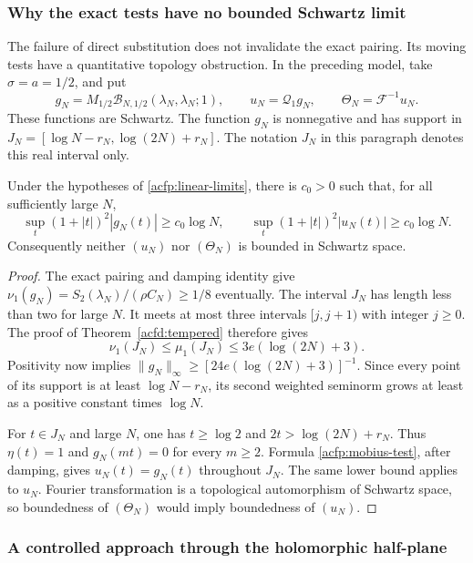 \subsubsection{Why the exact tests have no bounded Schwartz limit}

The failure of direct substitution does not invalidate the exact pairing.
Its moving tests have a quantitative topology obstruction.
In the preceding model, take $\sigma=a=1/2$, and put
\[
 g_N=M_{1/2}\mathcal B_{N,1/2}(\lambda_N,\lambda_N;1),\qquad
 u_N=\mathcal Q_1g_N,\qquad \Theta_N=\mathcal F^{-1}u_N.
\]
These functions are Schwartz.  The function $g_N$ is nonnegative and has
support in $J_N=[\log N-r_N,\log(2N)+r_N]$.
The notation $J_N$ in this paragraph denotes this real interval only.

\begin{proposition}\label{acfp:unbounded-tests}
Under the hypotheses of \eqref{acfp:linear-limits}, there is $c_0>0$
such that, for all sufficiently large $N$,
\[
 \sup_t(1+|t|)^2|g_N(t)|\geq c_0\log N,\qquad
 \sup_t(1+|t|)^2|u_N(t)|\geq c_0\log N.
\]
Consequently neither $(u_N)$ nor $(\Theta_N)$ is bounded in Schwartz space.
\end{proposition}

\begin{proof}
The exact pairing and damping identity give
$\nu_1(g_N)=S_2(\lambda_N)/(\rho C_N)\geq1/8$ eventually.
The interval $J_N$ has length less than two for large $N$.
It meets at most three intervals $[j,j+1)$ with integer $j\geq0$.
The proof of Theorem~\ref{acfd:tempered} therefore gives
\[
 \nu_1(J_N)\leq\mu_1(J_N)
       \leq3e(\log(2N)+3).
\]
Positivity now implies
$\|g_N\|_\infty\geq[24e(\log(2N)+3)]^{-1}$.
Since every point of its support is at least $\log N-r_N$, its second
weighted seminorm grows at least as a positive constant times $\log N$.

For $t\in J_N$ and large $N$, one has $t\geq\log2$ and
$2t>\log(2N)+r_N$.
Thus $\eta(t)=1$ and $g_N(mt)=0$ for every $m\geq2$.
Formula \eqref{acfp:mobius-test}, after damping, gives
$u_N(t)=g_N(t)$ throughout $J_N$.
The same lower bound applies to $u_N$.
Fourier transformation is a topological automorphism of Schwartz space,
so boundedness of $(\Theta_N)$ would imply boundedness of $(u_N)$.
\end{proof}

\subsubsection{A controlled approach through the holomorphic half-plane}

